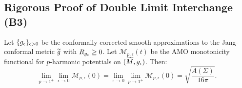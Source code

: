 \subsection{Rigorous Proof of Double Limit Interchange (B3)}

\begin{theorem}\label{thm:DoubleLimitComplete-app}
Let $\{g_{\epsilon}\}_{\epsilon > 0}$ be the conformally corrected smooth approximations to the Jang-conformal metric $\widetilde{g}$ with $R_{g_{\epsilon}} \ge 0$. Let $\mathcal{M}_{p,\epsilon}(t)$ be the AMO monotonicity functional for $p$-harmonic potentials on $(\widetilde{M}, g_{\epsilon})$. Then:
\begin{equation}\label{eq:DoubleLimitInterchange-app}
    \lim_{p \to 1^+} \lim_{\epsilon \to 0} \mathcal{M}_{p,\epsilon}(0) = \lim_{\epsilon \to 0} \lim_{p \to 1^+} \mathcal{M}_{p,\epsilon}(0) = \sqrt{\frac{A(\Sigma)}{16\pi}}.
\end{equation}
\end{theorem}

